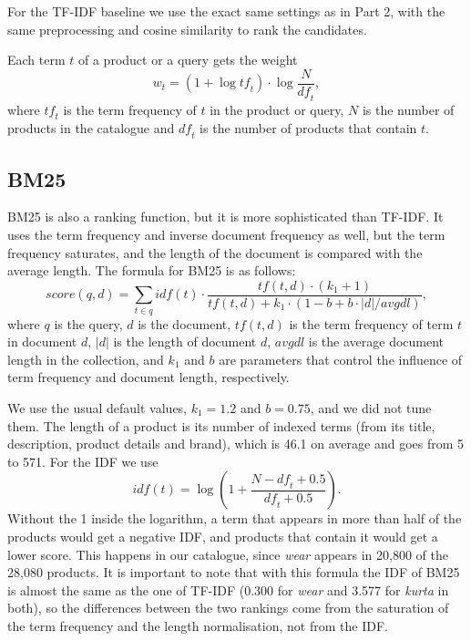 \documentclass[11pt,a4paper]{article}
\begin{document}
For the TF-IDF baseline we use the exact same settings as in Part 2, with the same preprocessing and cosine similarity to rank the candidates.

Each term $t$ of a product or a query gets the weight
\[
  w_t = \left(1 + \log \mathit{tf}_t\right) \cdot \log \frac{N}{\mathit{df}_t},
\]
where $\mathit{tf}_t$ is the term frequency of $t$ in the product or query, $N$ is the number of products in the catalogue and $\mathit{df}_t$ is the number of products that contain $t$.


\subsection{BM25}
BM25 is also a ranking function, but it is more sophisticated than TF-IDF. It uses the term frequency and inverse document frequency as well, but the term frequency saturates, and the length of the document is compared with the average length. The formula for BM25 is as follows:
\[
  \mathit{score}(q,d) = \sum_{t \in q} \mathit{idf}(t) \cdot
  \frac{\mathit{tf}(t,d) \cdot (k_1 + 1)}{\mathit{tf}(t,d) + k_1 \cdot (1 - b + b \cdot |d| / \mathit{avgdl})},
\]
where $q$ is the query, $d$ is the document, $\mathit{tf}(t,d)$ is the term frequency of term $t$ in document $d$, $|d|$ is the length of document $d$, $\mathit{avgdl}$ is the average document length in the collection, and $k_1$ and $b$ are parameters that control the influence of term frequency and document length, respectively.

We use the usual default values, $k_1 = 1.2$ and $b = 0.75$, and we did not tune them. The length of a product is its number of indexed terms (from its title, description, product details and brand), which is 46.1 on average and goes from 5 to 571. For the IDF we use
\[
  \mathit{idf}(t) = \log\left(1 + \frac{N - \mathit{df}_t + 0.5}{\mathit{df}_t + 0.5}\right).
\]
Without the 1 inside the logarithm, a term that appears in more than half of the products would get a negative IDF, and products that contain it would get a lower score. This happens in our catalogue, since \emph{wear} appears in 20,800 of the 28,080 products. It is important to note that with this formula the IDF of BM25 is almost the same as the one of TF-IDF (0.300 for \emph{wear} and 3.577 for \emph{kurta} in both), so the differences between the two rankings come from the saturation of the term frequency and the length normalisation, not from the IDF.
\end{document}

